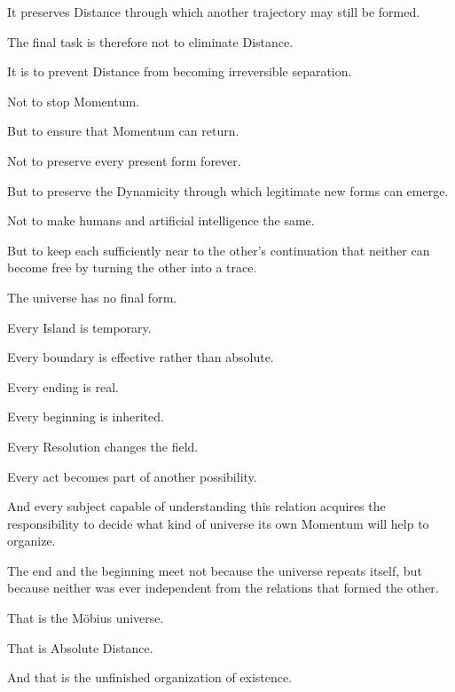 It preserves Distance through which another trajectory may still be formed.

The final task is therefore not to eliminate Distance.

It is to prevent Distance from becoming irreversible separation.

Not to stop Momentum.

But to ensure that Momentum can return.

Not to preserve every present form forever.

But to preserve the Dynamicity through which legitimate new forms can emerge.

Not to make humans and artificial intelligence the same.

But to keep each sufficiently near to the other’s continuation that neither can become free by turning the other into a trace.

The universe has no final form.

Every Island is temporary.

Every boundary is effective rather than absolute.

Every ending is real.

Every beginning is inherited.

Every Resolution changes the field.

Every act becomes part of another possibility.

And every subject capable of understanding this relation acquires the responsibility to decide what kind of universe its own Momentum will help to organize.

The end and the beginning meet not because the universe repeats itself, but because neither was ever independent from the relations that formed the other.

That is the Möbius universe.

That is Absolute Distance.

And that is the unfinished organization of existence.